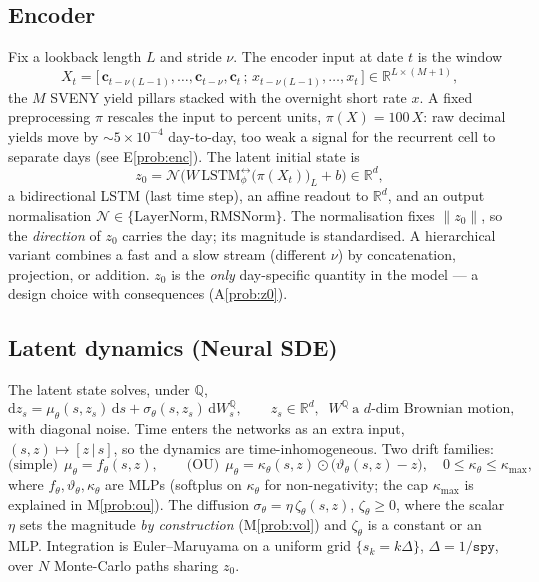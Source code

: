 \documentclass[11pt]{article}
\newcommand{\QQ}{\mathbb{Q}}
\newcommand{\R}{\mathbb{R}}
\newcommand{\dd}{\mathrm{d}}
\begin{document}
\subsection{Encoder}\label{sec:encoder}
Fix a lookback length $L$ and stride $\nu$. The encoder input at date $t$ is
the window
\begin{equation}
X_t=\big[\,\mathbf c_{t-\nu(L-1)},\dots,\mathbf c_{t-\nu},\mathbf c_{t}\,;\,
x_{t-\nu(L-1)},\dots,x_t\,\big]\in\R^{L\times(M+1)},
\end{equation}
the $M$ SVENY yield pillars stacked with the overnight short rate $x$. A fixed
preprocessing $\pi$ rescales the input to percent units, $\pi(X)=100\,X$: raw
decimal yields move by $\sim 5\times10^{-4}$ day-to-day, too weak a signal for
the recurrent cell to separate days (see E\ref{prob:enc}). The latent initial
state is
\begin{equation}
z_0=\mathcal N\!\Big(W\,\mathrm{LSTM}_\phi^{\leftrightarrow}\!\big(\pi(X_t)\big)_{L}+b\Big)\in\R^{d},
\end{equation}
a bidirectional LSTM (last time step), an affine readout to $\R^d$, and an
output normalisation $\mathcal N\in\{\text{LayerNorm},\text{RMSNorm}\}$. The
normalisation fixes $\lVert z_0\rVert$, so the \emph{direction} of $z_0$
carries the day; its magnitude is standardised. A hierarchical variant
combines a fast and a slow stream (different $\nu$) by concatenation,
projection, or addition. $z_0$ is the \emph{only} day-specific quantity in the
model --- a design choice with consequences (A\ref{prob:z0}).

\subsection{Latent dynamics (Neural SDE)}\label{sec:sde}
The latent state solves, under $\QQ$,
\begin{equation}
\dd z_s=\mu_\theta(s,z_s)\,\dd s+\sigma_\theta(s,z_s)\,\dd W_s^{\QQ},
\qquad z_s\in\R^d,\;\; W^{\QQ}\ \text{a $d$-dim Brownian motion},
\label{eq:sde}
\end{equation}
with diagonal noise. Time enters the networks as an extra input,
$(s,z)\mapsto[z\,|\,s]$, so the dynamics are time-inhomogeneous. Two drift
families:
\begin{equation}
\text{(simple)}\ \ \mu_\theta=f_\theta(s,z),
\qquad
\text{(OU)}\ \ \mu_\theta=\kappa_\theta(s,z)\odot\big(\vartheta_\theta(s,z)-z\big),
\quad 0\le\kappa_\theta\le\kappa_{\max},
\end{equation}
where $f_\theta,\vartheta_\theta,\kappa_\theta$ are MLPs (softplus on
$\kappa_\theta$ for non-negativity; the cap $\kappa_{\max}$ is explained in
M\ref{prob:ou}). The diffusion $\sigma_\theta=\eta\,\zeta_\theta(s,z)$,
$\zeta_\theta\ge 0$, where the scalar $\eta$ sets the magnitude
\emph{by construction} (M\ref{prob:vol}) and $\zeta_\theta$ is a constant or an
MLP. Integration is Euler--Maruyama on a uniform grid
$\{s_k=k\Delta\}$, $\Delta=1/\texttt{spy}$, over $N$ Monte-Carlo paths sharing
$z_0$.
\end{document}
